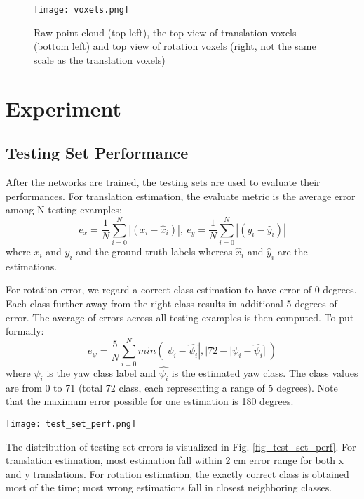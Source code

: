 \documentclass[conference]{IEEEtran}
\begin{document}
\begin{figure}[htbp]
 \centerline{\texttt{[image: voxels.png]}}
 \caption{Raw point cloud (top left), the top view of translation voxels (bottom left) and top view of rotation voxels (right, not the same scale as the translation voxels)}
 \label{fig_voxels}
\end{figure}


\section{Experiment}
\subsection{Testing Set Performance}
After the networks are trained, the testing sets are used to evaluate their performances. For translation estimation, the evaluate metric is the average error among N testing examples:
$$e_{x} = \frac{1}{N}\sum_{i=0}^{N}|(x_{i} - \hat{x}_{i})|,\
  e_{y} = \frac{1}{N}\sum_{i=0}^{N}|(y_{i} - \hat{y}_{i})|$$
where $x_{i}$ and $y_{i}$ and the ground truth labels whereas $\hat{x}_{i}$ and $\hat{y}_{i}$ are the estimations.

For rotation error, we regard a correct class estimation to have error of 0 degrees. Each class further away from the right class results in additional 5 degrees of error. The average of errors across all testing examples is then computed. To put formally:
$$e_{\psi} = \frac{5}{N}\sum_{i=0}^{N}min(
|\psi_{i} - \hat{\psi_{i}}|,
|72 - |\psi_{i} - \hat{\psi_{i}}||)$$
where $\psi_{i}$ is the yaw class label and $\hat{\psi_{i}}$ is the estimated yaw class. The class values are from 0 to 71 (total 72 class, each representing a range of 5 degrees). Note that the maximum error possible for one estimation is 180 degrees.

\begin{figure*}[t]
  \texttt{[image: test\_set\_perf.png]}
  \caption{Testing Set Performance}
  \label{fig_test_set_perf}
\end{figure*}
The distribution of testing set errors is visualized in Fig. \ref{fig_test_set_perf}. For translation estimation, most estimation fall within 2 cm error range for both x and y translations. For rotation estimation, the exactly correct class is obtained most of the time; most wrong estimations fall in closest neighboring classes.
\end{document}
